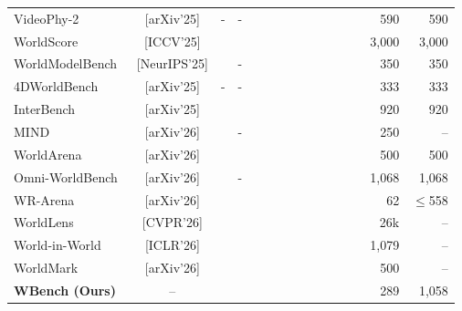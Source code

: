 \documentclass{llmxive}
\providecommand{\pub}[1]{{\scriptsize{[{#1}]}}}
\providecommand{\cmark}{\ding{51}}
\providecommand{\xmark}{\ding{55}}
\providecommand{\numvideo}{289\xspace}
\providecommand{\numturn}{1,058\xspace}
\providecommand{\benchmark}{WBench }
\begin{document}
\begin{table}[!htbp]
\begin{tabular}{@{}l c cc cccc ccccc rr@{}}
VideoPhy-2~\cite{bansal2025videophy2}             & \pub{arXiv'25}   & - & - & \xmark & \xmark & \xmark & \xmark & \cmark & \xmark & \xmark & \xmark & \cmark & 590   & 590   \\
WorldScore~\cite{duan2024worldscore}              & \pub{ICCV'25}    & \cmark & \xmark & \cmark & \xmark & \cmark & \xmark & \cmark & \cmark & \xmark & \xmark & \xmark & 3,000 & 3,000 \\
WorldModelBench~\cite{wang2024worldmodelbench}    & \pub{NeurIPS'25} & \cmark & - & \cmark & \cmark & \xmark & \xmark & \xmark & \cmark & \cmark & \xmark & \cmark & 350   & 350   \\
4DWorldBench~\cite{lu2025_4dworldbench}           & \pub{arXiv'25}   & - & - & \xmark & \xmark & \xmark & \xmark & \cmark & \xmark & \xmark & \xmark & \cmark & 333   & 333   \\
InterBench~\cite{tang2025interbench}              & \pub{arXiv'25}   & \cmark & \cmark & \xmark & \cmark & \cmark & \xmark & \cmark & \xmark & \cmark & \cmark & \cmark & 920   & 920   \\
MIND~\cite{ye2026mind}                            & \pub{arXiv'26}   & \cmark & - & \cmark & \xmark & \xmark & \xmark & \cmark & \xmark & \cmark & \cmark & \xmark & 250   & --    \\
WorldArena~\cite{shang2026worldarena}             & \pub{arXiv'26}   & \cmark & \xmark & \cmark & \cmark & \xmark & \xmark & \cmark & \xmark & \cmark & \cmark & \cmark & 500   & 500   \\
Omni-WorldBench~\cite{wu2026omniworldbench}       & \pub{arXiv'26}   & \cmark & - & \cmark & \cmark & \cmark & \xmark & \cmark & \xmark & \cmark & \cmark & \cmark & 1,068 & 1,068 \\
WR-Arena~\cite{gao2026wrena}                      & \pub{arXiv'26}   & \cmark & \xmark & \cmark & \cmark & \xmark & \xmark & \xmark & \xmark & \cmark & \xmark & \cmark & 62    & $\leq$558 \\
WorldLens~\cite{worldlens2025}                    & \pub{CVPR'26}    & \cmark & \xmark & \cmark & \xmark & \xmark & \xmark & \cmark & \cmark & \cmark & \cmark & \cmark & 26k   & --   \\
World-in-World~\cite{zhang2025worldinworld}       & \pub{ICLR'26}    & \cmark & \xmark & \cmark & \cmark & \xmark & \xmark & \cmark & \xmark & \cmark & \xmark & \xmark & 1,079 & --    \\
WorldMark~\cite{xu2026worldmark}                  & \pub{arXiv'26}   & \cmark & \cmark & \cmark & \xmark & \xmark & \xmark & \cmark & \xmark & \cmark & \cmark & \xmark & 500   & --    \\
\midrule
\textbf{\benchmark (Ours)}                        & --        & \cmark & \cmark & \cmark & \cmark & \cmark & \cmark & \cmark & \cmark & \cmark & \cmark & \cmark & \numvideo  & \numturn \\
\bottomrule
\end{tabular}
\end{table}
\end{document}
